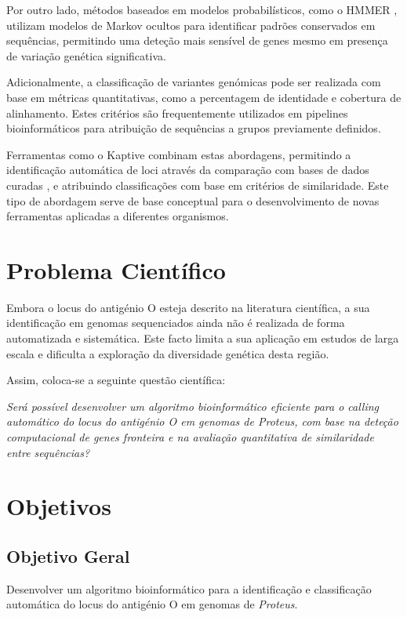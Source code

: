 \documentclass[a4paper,11pt]{article}
\begin{document}
Por outro lado, métodos baseados em modelos probabilísticos, como o HMMER \cite{eddy2011}, utilizam modelos de Markov ocultos para identificar padrões conservados em sequências, permitindo uma deteção mais sensível de genes mesmo em presença de variação genética significativa.

Adicionalmente, a classificação de variantes genómicas pode ser realizada com base em métricas quantitativas, como a percentagem de identidade e cobertura de alinhamento. Estes critérios são frequentemente utilizados em pipelines bioinformáticos para atribuição de sequências a grupos previamente definidos.

Ferramentas como o Kaptive combinam estas abordagens, permitindo a identificação automática de loci através da comparação com bases de dados curadas \cite{lam2022}, e atribuindo classificações com base em critérios de similaridade. Este tipo de abordagem serve de base conceptual para o desenvolvimento de novas ferramentas aplicadas a diferentes organismos.

\section{Problema Científico}

Embora o locus do antigénio O esteja descrito na literatura científica, a sua identificação em genomas sequenciados ainda não é realizada de forma automatizada e sistemática. Este facto limita a sua aplicação em estudos de larga escala e dificulta a exploração da diversidade genética desta região.

Assim, coloca-se a seguinte questão científica:

\textit{Será possível desenvolver um algoritmo bioinformático eficiente para o calling automático do locus do antigénio O em genomas de \textit{Proteus}, com base na deteção computacional de genes fronteira e na avaliação quantitativa de similaridade entre sequências?}

\section{Objetivos}

\subsection{Objetivo Geral}

Desenvolver um algoritmo bioinformático para a identificação e classificação automática do locus do antigénio O em genomas de \textit{Proteus}.
\end{document}
